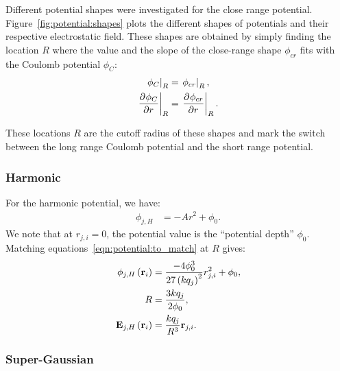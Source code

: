 Different potential shapes were investigated for the close range potential.
Figure~\ref{fig:potential:shapes} plots the different shapes of potentials and
their respective electrostatic field. These shapes are obtained by simply
finding the location $R$ where the value and the slope of the close-range shape
$\phi_{cr}$ fits with the Coulomb potential $\phi_C$:
\begin{subequations}
\begin{align}
\left. \phi_C        \right|_{R} & = \left. \phi_{cr} \right|_{R}, \\
\left. \frac{\partial^{{}} \phi_C}{\partial r^{{}}} \right|_{R} & = \left. \frac{\partial^{{}} \phi_{cr}}{\partial r^{{}}} \right|_{R}.
\end{align}
\label{eqn:potential:to_match}
\end{subequations}

These locations $R$ are the cutoff radius of these shapes and mark the switch
between the long range Coulomb potential and the short range potential.


\subsubsection{Harmonic}

For the harmonic potential, we have:
\begin{align}
\phi_{j,H} & = -A r^2 + \phi_0.
\end{align}
We note that at $r_{j,i} = 0$, the potential value is the ``potential depth''
$\phi_0$.
Matching equations~\eqref{eqn:potential:to_match} at $R$ gives:
\begin{subequations}
\begin{align}
\phi_{j,H}\left( \textbf{r}_i \right) & = \frac{-4 \phi_0^3}{27 \left( k q_j \right)^2} r_{j,i}^2 + \phi_0,
\\
R & = \frac{3 k q_j}{2 \phi_0}, \\
\textbf{E}_{j,H}\left( \textbf{r}_i \right) & = \frac{k q_j}{R^3} \textbf{r}_{j,i}.
\end{align}
\end{subequations}


\subsubsection{Super-Gaussian}


